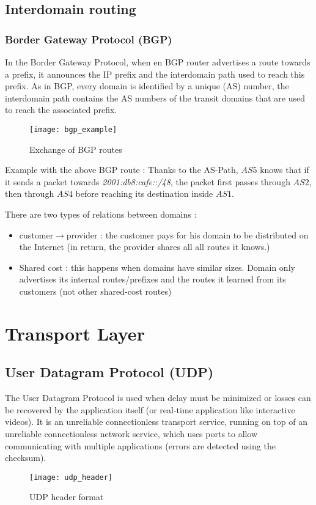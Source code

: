 \newpage
\subsection{Interdomain routing}

\subsubsection[BGP]{Border Gateway Protocol (BGP)}

In the Border Gateway Protocol, when en BGP router advertises a route towards a prefix, it announces the IP prefix and the interdomain path used to reach this prefix. As in BGP, every domain is identified by a unique  (AS) number, the interdomain path contains the AS numbers of the transit domains that are used to reach the associated prefix.
\begin{figure}[H]
	\centering
	\texttt{[image: bgp\_example]}
	\caption{Exchange of BGP routes}
\end{figure}
Example with the above BGP route : Thanks to the AS-Path, $AS5$ knows that if it sends a packet towards \textit{2001:db8:cafe::/48}, the packet first passes through $AS2$, then through $AS4$ before reaching its destination inside $AS1$.

There are two types of relations between domains :
\begin{itemize}
\item customer$\rightarrow$provider : the customer pays for his domain to be distributed on the Internet (in return, the provider shares all all routes it knows.)
\item Shared cost : this happens when domains have similar sizes. Domain only advertises its internal routes/prefixes and the routes it learned from its customers (not other shared-cost routes)
\end{itemize}

\section{Transport Layer}

\subsection[UDP]{User Datagram Protocol (UDP)}

The User Datagram Protocol is used when delay must be minimized or losses can be recovered by the application itself (or real-time application like interactive videos). It is an unreliable connectionless transport service, running on top of an unreliable connectionless network service, which uses ports to allow communicating with multiple applications (errors are detected using the checksum).
\begin{figure}[H]
    \centering
    \texttt{[image: udp\_header]}
    \caption{UDP header format}
\end{figure}

